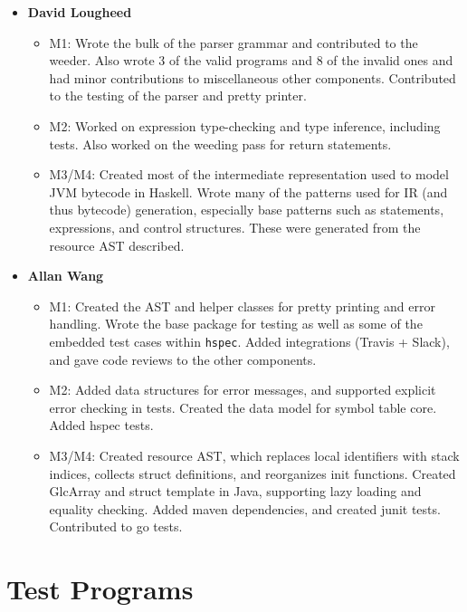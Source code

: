 \documentclass[11pt]{article}
\begin{document}
\begin{itemize}
\begin{itemize}
                  (required Python) and then run assembled classes
                  (required Java).
	\end{itemize}
	\item \textbf{David Lougheed}
	\begin{itemize}
		\item M1: Wrote the bulk of the parser grammar
		and contributed to the weeder. Also wrote 3 of the valid programs
		and 8 of the invalid ones and had minor contributions to
		miscellaneous other components.  Contributed to the testing of the
		parser and pretty printer.
		\item M2: Worked on expression type-checking and
		type inference, including tests. Also worked on the weeding pass for
		return statements.
		\item M3/M4: Created most of the intermediate representation used to
		model JVM bytecode in Haskell. Wrote many of the patterns used for IR
		(and thus bytecode) generation, especially base patterns such as
		statements, expressions, and control structures. These were generated
		from the resource AST described.
	\end{itemize}
	\item \textbf{Allan Wang}
	\begin{itemize}
		\item M1: Created the AST and helper classes for
		pretty printing and error handling.  Wrote the base package for
		testing as well as some of the embedded test cases within
		\texttt{hspec}.  Added integrations (Travis + Slack), and gave code
		reviews to the other components.
		\item M2: Added data structures for error messages,
		and supported explicit error checking in tests. Created the data
		model for symbol table core. Added hspec tests.
		\item M3/M4: Created resource AST, which replaces local identifiers with stack indices, collects struct definitions, and reorganizes init functions. Created GlcArray and struct template in Java, supporting lazy loading and equality checking. Added maven dependencies, and created junit tests. Contributed to go tests.
	\end{itemize}
\end{itemize}

\newpage

 

\newpage
\appendix
\section{Test Programs}
\label{sec:appendixa}
\end{document}
